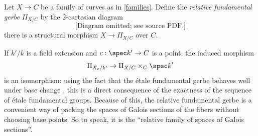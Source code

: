





Let $X\to C$ be a family of curves as in \autoref{families}. Define the \emph{relative fundamental gerbe} $\Pi_{X/C}$ by the $2$-cartesian diagram
\[\text{[Diagram omitted; see source PDF.]}\]
there is a structural morphism $X\to\Pi_{X/C}$ over $C$.



If $k'/k$ is a field extension and $c:\spec k'\to C$ is a point, the induced morphism
\[\Pi_{X_{c}/k'}\to\Pi_{X/C}\times_{C}\spec k'\]
is an isomorphism: using the fact that the étale fundamental gerbe behaves well under base change \cite[Proposition A.18]{anab}, this is a direct consequence of the exactness of the sequence of étale fundamental groups. Because of this, the relative fundamental gerbe is a convenient way of packing the spaces of Galois sections of the fibers without choosing base points. So to speak, it is the ``relative family of spaces of Galois sections''.

